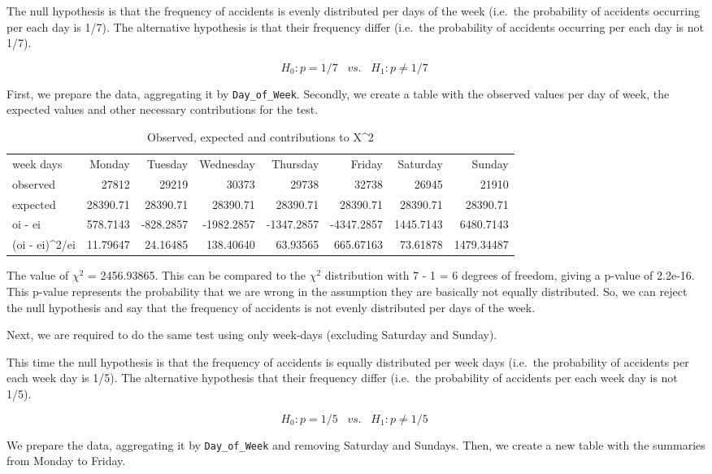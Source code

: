 \documentclass[]{article}
\begin{document}
The null hypothesis is that the frequency of accidents is evenly
distributed per days of the week (i.e.~the probability of accidents
occurring per each day is 1/7). The alternative hypothesis is that their
frequency differ (i.e.~the probability of accidents occurring per each
day is not 1/7).

\[H_{0}: p=1/7\;\;\;vs.\;\;\;H_{1}:p\neq1/7\;\] \pagebreak

First, we prepare the data, aggregating it by \texttt{Day\_of\_Week}.
Secondly, we create a table with the observed values per day of week,
the expected values and other necessary contributions for the test.

\begin{longtable}[]{@{}lrrrrrrr@{}}
\caption{Observed, expected and contributions to X\^{}2}\tabularnewline
\toprule
week days & Monday & Tuesday & Wednesday & Thursday & Friday & Saturday
& Sunday\tabularnewline
observed & 27812 & 29219 & 30373 & 29738 & 32738 & 26945 &
21910\tabularnewline
expected & 28390.71 & 28390.71 & 28390.71 & 28390.71 & 28390.71 &
28390.71 & 28390.71\tabularnewline
oi - ei & 578.7143 & -828.2857 & -1982.2857 & -1347.2857 & -4347.2857 &
1445.7143 & 6480.7143\tabularnewline
(oi - ei)\^{}2/ei & 11.79647 & 24.16485 & 138.40640 & 63.93565 &
665.67163 & 73.61878 & 1479.34487\tabularnewline
\bottomrule
\end{longtable}

The value of \(\chi ^2\) = 2456.93865. This can be compared to the
\(\chi ^2\) distribution with 7 - 1 = 6 degrees of freedom, giving a
p-value of 2.2e-16. This p-value represents the probability that we are
wrong in the assumption they are basically not equally distributed. So,
we can reject the null hypothesis and say that the frequency of
accidents is not evenly distributed per days of the week.

Next, we are required to do the same test using only week-days
(excluding Saturday and Sunday).

This time the null hypothesis is that the frequency of accidents is
equally distributed per week days (i.e.~the probability of accidents per
each week day is 1/5). The alternative hypothesis that their frequency
differ (i.e.~the probability of accidents per each week day is not 1/5).

\[H_{0}: p=1/5\;\;\;vs.\;\;\;H_{1}:p\neq1/5\;\]

We prepare the data, aggregating it by \texttt{Day\_of\_Week} and
removing Saturday and Sundays. Then, we create a new table with the
summaries from Monday to Friday.
\end{document}
